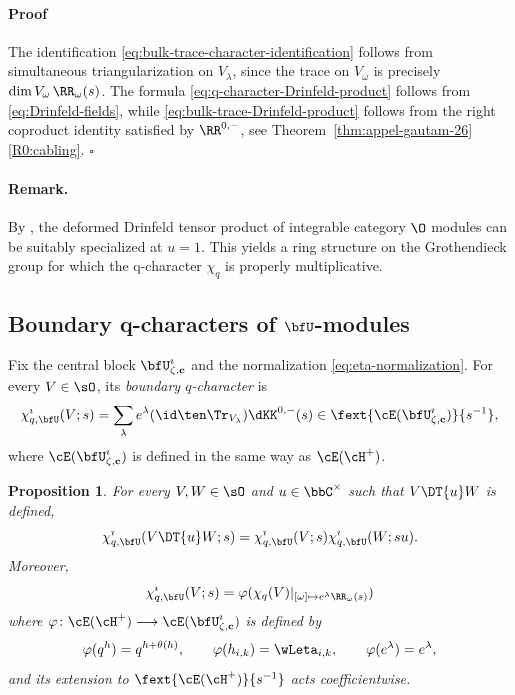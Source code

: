 \documentclass[reqno]{amsart}
\numberwithin{equation}{section}
\newtheorem*{proposition}{Proposition}
\newenvironment{pf}{\medskip\paragraph{{\sc Proof}}}{\hfill$\square$\par\medskip}
\newenvironment{remark}{\medskip\paragraph{{\bf Remark.}}}{\par\medskip}
\begin{document}
\begin{pf}
The identification \eqref{eq:bulk-trace-character-identification}
follows from simultaneous triangularization on $V_\lambda$,
since the trace on $V_\omega$ is precisely $\dim V_\omega\,\RR_\omega(s)$.
The formula  \eqref{eq:q-character-Drinfeld-product} follows from 
\eqref{eq:Drinfeld-fields}, while 
\eqref{eq:bulk-trace-Drinfeld-product} follows from the right coproduct identity
satisfied by $\RR^{0,-}$, see Theorem~\ref{thm:appel-gautam-26} \eqref{R0:cabling}.
\end{pf}

\begin{remark}
By \cite[Sec.~5.1]{hernandez-07}, the deformed Drinfeld tensor product of 
integrable category $\O$ modules can be suitably specialized at $u=1$. This yields
a ring structure on the Grothendieck group for which the q-character $\chi_q$ is properly multiplicative.
\hfill\rmkend
\end{remark}

\subsection{Boundary q-characters of \texorpdfstring{$\bfU$}{U}-modules}
\label{ss:boundary-q-characters}
\label{ss:boundary-right-trace}

Fix the central block $\bfU^\imath_{\zeta,\mathbf c}$ and the
normalization \eqref{eq:eta-normalization}.
For every $V\in\sO$, its \emph{boundary $q$-character} is
\begin{equation}\label{eq:right-boundary-q-character}
\chi^\imath_{q,\bfU}(V;s)
=\sum_\lambda e^\lambda(\id\ten\Tr_{V_\lambda})\dKK^{0,-}(s)
\in\fext{\cE(\bfU^\imath_{\zeta,\mathbf c})}{s^{-1}},
\end{equation}
where $\cE(\bfU^\imath_{\zeta,\mathbf c})$ is defined in the same way as $\cE(\cH^+)$.

\begin{proposition}\label{prop:boundary-right-multiplicativity}
For every $V,W\in\sO$ and $u\in\bbC^\times$ such that 
$V\DT{u}W$ is defined,
\begin{equation}\label{eq:right-boundary-q-character-multiplicativity}
\chi^\imath_{q,\bfU}(V\DT{u}W;s)
=\chi^\imath_{q,\bfU}(V;s)
\chi^\imath_{q,\bfU}(W;su).
\end{equation}
Moreover, 
\begin{equation}
\chi^\imath_{q,\bfU}(V;s)
=\varphi(\chi_q(V)\vert_{[\omega]\mapsto e^\lambda\RR_\omega(s)})
\end{equation} 
where $ \varphi\colon\cE(\cH^+)\longrightarrow\cE(\bfU^\imath_{\zeta,\mathbf c})$ is defined by
\begin{equation}\label{eq:boundary-Cartan-substitution}
\varphi(q^h)= q^{h+\theta(h)},
\qquad \varphi(h_{i,k})=\wLeta_{i,k},
\qquad \varphi(e^\lambda)=e^{\lambda},
\end{equation}
and its extension to $\fext{\cE(\cH^+)}{s^{-1}}$ acts coefficientwise.
\end{proposition}
\end{document}
